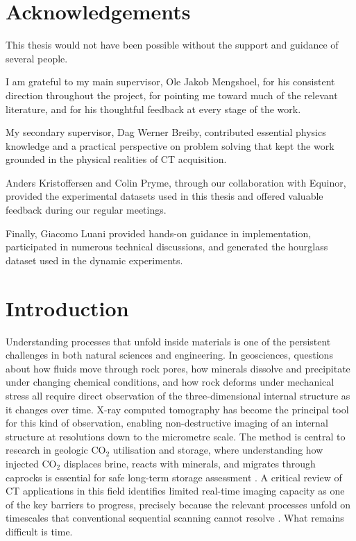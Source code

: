 \documentclass[12pt, a4paper, twoside]{report}
\begin{document}
\cleardoublepage
\chapter*{Acknowledgements}

This thesis would not have been possible without the support and guidance of several people.

I am grateful to my main supervisor, Ole Jakob Mengshoel, for his consistent direction throughout the project, for pointing me toward much of the relevant literature, and for his thoughtful feedback at every stage of the work.

My secondary supervisor, Dag Werner Breiby, contributed essential physics knowledge and a practical perspective on problem solving that kept the work grounded in the physical realities of CT acquisition.

Anders Kristoffersen and Colin Pryme, through our collaboration with Equinor, provided the experimental datasets used in this thesis and offered valuable feedback during our regular meetings.

Finally, Giacomo Luani provided hands-on guidance in implementation, participated in numerous technical discussions, and generated the hourglass dataset used in the dynamic experiments.

\cleardoublepage
\tableofcontents
\listoffigures
\listoftables

\cleardoublepage
{}

\chapter{Introduction}
\label{chap:introduction}

Understanding processes that unfold inside materials is one of the persistent challenges in both natural sciences and engineering. In geosciences, questions about how fluids move through rock pores, how minerals dissolve and precipitate under changing chemical conditions, and how rock deforms under mechanical stress all require direct observation of the three-dimensional internal structure as it changes over time. X-ray computed tomography has become the principal tool for this kind of observation, enabling non-destructive imaging of an internal structure at resolutions down to the micrometre scale. The method is central to research in geologic CO$_2$ utilisation and storage, where understanding how injected CO$_2$ displaces brine, reacts with minerals, and migrates through caprocks is essential for safe long-term storage assessment \citep{gan2020application}. A critical review of CT applications in this field identifies limited real-time imaging capacity as one of the key barriers to progress, precisely because the relevant processes unfold on timescales that conventional sequential scanning cannot resolve \citep{gan2020application}. What remains difficult is time.
\end{document}
